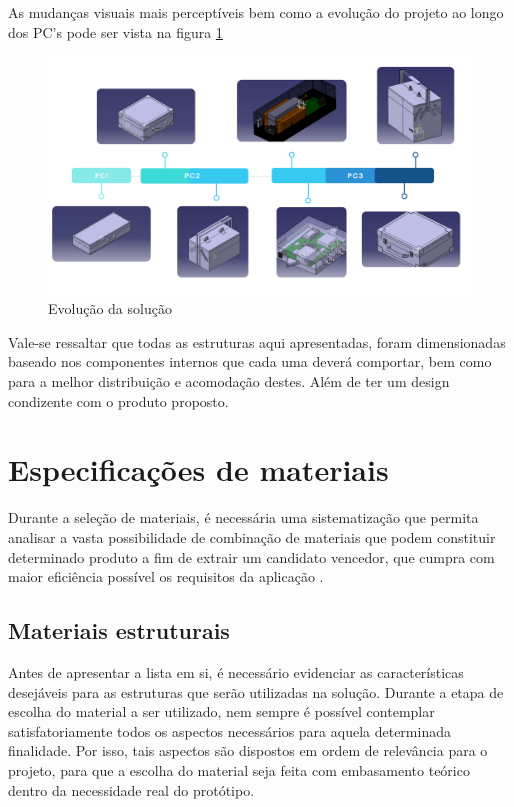 \par As mudanças visuais mais perceptíveis bem como a evolução do projeto ao longo dos PC's pode ser vista na figura \ref{fig:evolucao}

\begin{figure}[H]
	\centering
	\label{bateria_maleta}
		\includegraphics[width=1\textwidth]{figuras/mudanca_estrutura.png}
	\caption{Evolução da solução}
	\label{fig:evolucao}
	\end{figure}

\par Vale-se ressaltar que todas as estruturas aqui apresentadas, foram dimensionadas baseado nos componentes internos que cada uma deverá comportar, bem como para a melhor distribuição e acomodação destes. Além de ter um design condizente com o produto proposto.

\section{Especificações de materiais}
\label{sub:Especificações de materiais}

\par Durante a seleção de materiais, é necessária uma sistematização que permita analisar a vasta possibilidade de combinação de materiais que podem constituir determinado produto a fim de extrair um candidato vencedor, que cumpra com maior eficiência possível os requisitos da aplicação \cite{walterconteudo}.

\subsection{Materiais estruturais}

\par Antes de apresentar a lista em si, é necessário evidenciar as características desejáveis para as estruturas que serão utilizadas na solução. Durante a etapa de escolha do material a ser utilizado, nem sempre é possível contemplar satisfatoriamente todos os aspectos necessários para aquela determinada finalidade. Por isso, tais aspectos são dispostos em ordem de relevância para o projeto, para que a escolha do material seja feita com embasamento teórico dentro da necessidade real do protótipo. 

